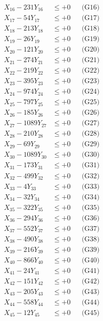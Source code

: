 \documentclass[a4paper,10pt]{article}
\begin{document}
{\begin{align}
X_{16} - 231Y_{16} &\leq +0 && \text{(G16)} \\
X_{17} - 54Y_{17} &\leq +0 && \text{(G17)} \\
X_{18} - 213Y_{18} &\leq +0 && \text{(G18)} \\
X_{19} - 26Y_{19} &\leq +0 && \text{(G19)} \\
X_{20} - 121Y_{20} &\leq +0 && \text{(G20)} \\
\allowbreak
X_{21} - 274Y_{21} &\leq +0 && \text{(G21)} \\
X_{22} - 219Y_{22} &\leq +0 && \text{(G22)} \\
X_{23} - 395Y_{23} &\leq +0 && \text{(G23)} \\
X_{24} - 974Y_{24} &\leq +0 && \text{(G24)} \\
X_{25} - 797Y_{25} &\leq +0 && \text{(G25)} \\
X_{26} - 185Y_{26} &\leq +0 && \text{(G26)} \\
X_{27} - 1089Y_{27} &\leq +0 && \text{(G27)} \\
X_{28} - 210Y_{28} &\leq +0 && \text{(G28)} \\
X_{29} - 69Y_{29} &\leq +0 && \text{(G29)} \\
X_{30} - 1089Y_{30} &\leq +0 && \text{(G30)} \\
\allowbreak
X_{31} - 173Y_{31} &\leq +0 && \text{(G31)} \\
X_{32} - 499Y_{32} &\leq +0 && \text{(G32)} \\
X_{33} - 4Y_{33} &\leq +0 && \text{(G33)} \\
X_{34} - 32Y_{34} &\leq +0 && \text{(G34)} \\
X_{35} - 322Y_{35} &\leq +0 && \text{(G35)} \\
X_{36} - 294Y_{36} &\leq +0 && \text{(G36)} \\
X_{37} - 552Y_{37} &\leq +0 && \text{(G37)} \\
X_{38} - 490Y_{38} &\leq +0 && \text{(G38)} \\
X_{39} - 216Y_{39} &\leq +0 && \text{(G39)} \\
X_{40} - 866Y_{40} &\leq +0 && \text{(G40)} \\
\allowbreak
X_{41} - 24Y_{41} &\leq +0 && \text{(G41)} \\
X_{42} - 151Y_{42} &\leq +0 && \text{(G42)} \\
X_{43} - 205Y_{43} &\leq +0 && \text{(G43)} \\
X_{44} - 558Y_{44} &\leq +0 && \text{(G44)} \\
X_{45} - 12Y_{45} &\leq +0 && \text{(G45)} \\

\end{align}}
\end{document}
